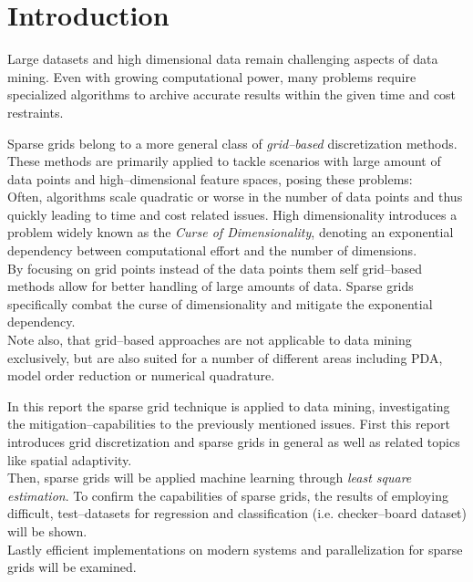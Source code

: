 \section{Introduction}
Large datasets and high dimensional data remain challenging aspects of data
mining. Even with growing computational power, many problems require
specialized algorithms to archive accurate results within the given time and
cost restraints.

\par

Sparse grids belong to a more general class of \emph{grid--based}
discretization methods. These methods are primarily applied to
tackle scenarios with large amount of data points and high--dimensional
feature spaces, posing these problems:
\\
Often, algorithms scale quadratic or worse in the number of data points and
thus quickly leading to time and cost related issues.
High dimensionality introduces a problem widely known as the \emph{Curse of
Dimensionality}, denoting an exponential dependency between computational
effort and the number of dimensions. \\
By focusing on grid points instead
of the data points them self grid--based methods allow for better handling of large amounts of data. 
Sparse grids specifically combat the curse of dimensionality and mitigate
the exponential dependency. \\
Note also, that grid--based approaches are not applicable to data mining
exclusively, but are also
suited for a number of different areas including PDA, model order
reduction or numerical quadrature.

\par

In this report the sparse grid technique is applied to data mining,
investigating the mitigation--capabilities to the previously mentioned issues.
First this report introduces grid discretization and sparse grids in
general as well as related topics like spatial adaptivity. \\
Then, sparse grids will be applied machine learning
through \emph{least square estimation}. To confirm the capabilities
of sparse grids, the results of employing difficult,
test--datasets for regression and classification (i.e.
checker--board dataset) will be shown. \\
Lastly  efficient implementations on modern systems and parallelization for
sparse grids will be examined.


